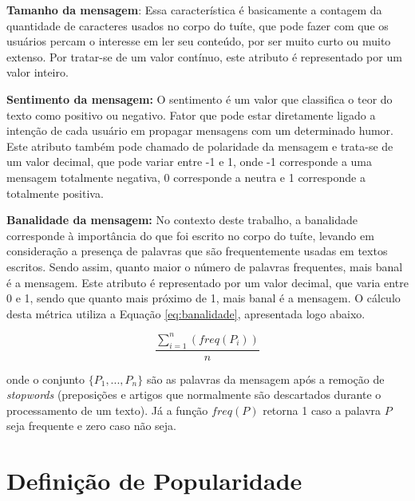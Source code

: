 \documentclass[oneside,openright,12pt]{ufsm_2015} %
\begin{document}
    \par \textbf{Tamanho da mensagem}: Essa característica é basicamente a contagem da quantidade de caracteres usados no corpo do tuíte, que pode fazer com que os usuários percam o interesse em ler seu conteúdo, por ser muito curto ou muito extenso. Por tratar-se de um valor contínuo, este atributo é representado por um valor inteiro.

    \par \textbf{Sentimento da mensagem:} O sentimento é um valor que classifica o teor do texto como positivo ou negativo. Fator que pode estar diretamente ligado a intenção de cada usuário em propagar mensagens com um determinado humor. Este atributo também pode chamado de polaridade da mensagem e trata-se de um valor decimal, que pode variar entre -1 e 1, onde -1 corresponde a uma mensagem totalmente negativa, 0 corresponde a neutra e 1 corresponde a totalmente positiva.

    \par \textbf{Banalidade da mensagem:} No contexto deste trabalho, a banalidade corresponde à importância do que foi escrito no corpo do tuíte, levando em consideração a presença de palavras que são frequentemente usadas em textos escritos. Sendo assim, quanto maior o número de palavras frequentes, mais banal é a mensagem. Este atributo é representado por um valor decimal, que varia entre 0 e 1, sendo que quanto mais próximo de 1, mais banal é a mensagem. O cálculo desta métrica utiliza a Equação \ref{eq:banalidade}, apresentada logo abaixo.

    \begin{equation} \label{eq:banalidade}
    \frac{\sum_{i=1}^n (freq(P_i))}{n}
    \end{equation}
    
    \par onde o conjunto $\{P_1, ..., P_n\}$ são as palavras da mensagem após a remoção de \textit{stopwords} (preposições e artigos que normalmente são descartados durante o processamento de um texto). Já a função $freq(P)$ retorna 1 caso a palavra $P$ seja frequente e zero caso não seja.


\section{Definição de Popularidade}
\label{sec:def-popularidade}
\end{document}
